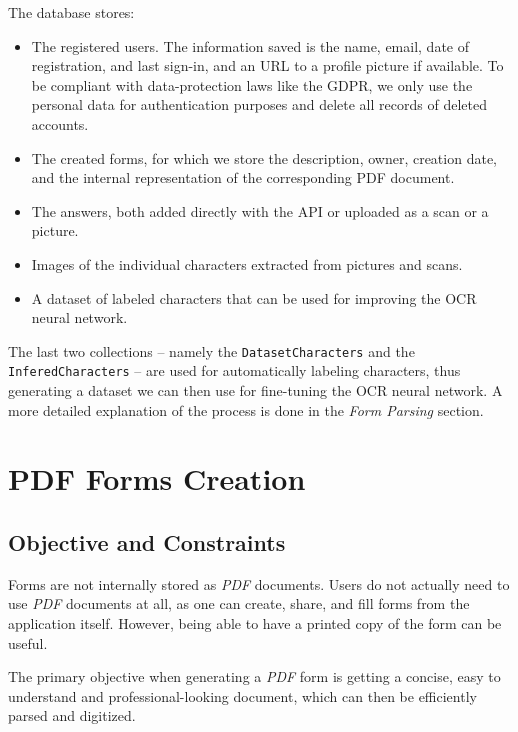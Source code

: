 \documentclass[11pt, a4paper]{report}
\def\code#1{\texttt{#1}}
\begin{document}
The database stores:
\begin{itemize}
    \item The registered users. The information saved is the name, email, date of registration, and last sign-in, and an URL to a profile picture if available. To be compliant with data-protection laws like the GDPR, we only use the personal data for authentication purposes and delete all records of deleted accounts.
    \item The created forms, for which we store the description, owner, creation date, and the internal representation of the corresponding PDF document.
    \item The answers, both added directly with the API or uploaded as a scan or a picture.
    \item Images of the individual characters extracted from pictures and scans.
    \item A dataset of labeled characters that can be used for improving the OCR neural network.
\end{itemize}


The last two collections -- namely the \code{DatasetCharacters} and the \code{InferedCharacters} -- are used for automatically labeling characters, thus generating a dataset we can then use for fine-tuning the OCR neural network. A more detailed explanation of the process is done in the \textit{Form Parsing} section.


\chapter{PDF Forms Creation}
\label{chapter-pdf-form-creation}

\section{Objective and Constraints}

Forms are not internally stored as \textit{PDF} documents. Users do not actually need to use \textit{PDF} documents at all, as one can create, share, and fill forms from the application itself. However, being able to have a printed copy of the form can be useful.

The primary objective when generating a \textit{PDF} form is getting a concise, easy to understand and professional-looking document, which can then be efficiently parsed and digitized.
\end{document}
